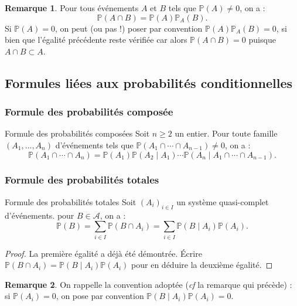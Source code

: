 \documentclass[french]{article}
\renewcommand{\P}{\mathbb{P}}
\theoremstyle{plain}
\theoremstyle{definition}
\newtheorem*{rmq}{Remarque}
\theoremstyle{remark}
\begin{document}
\begin{rmq}
	Pour tous événements $A$ et $B$ tels que $\P(A)\ne0$, on a : $$\P(A\cap B)=\P(A)\P_A(B).$$
	Si $\P(A)=0$, on peut (ou pas !) poser par convention $\P(A)\P_A(B)=0$, si bien que l'égalité précédente reste vérifiée car alors $\P(A\cap B)=0$ puisque $A\cap B\subset A$.
\end{rmq}

\subsection{Formules liées aux probabilités conditionnelles}

\subsubsection*{Formule des probabilités composée}

\begin{thm}{Formule des probabilités composées}%
	Soit $n\geqslant 2$ un entier. Pour toute famille $(A_1,\ldots,A_n)$ d'événements tels que $\P(A_1\cap\cdots\cap A_{n-1})\ne 0$, on a : 
	$$\P(A_1\cap\cdots\cap A_n)=\P(A_1)\P(A_2\mid A_1)\cdots\P(A_n\mid A_1\cap\cdots\cap A_{n-1}).$$
\end{thm}

\subsubsection*{Formule des probabilités totales}

\begin{thm}{Formule des probabilités totales}%
	Soit $(A_i)_{i\in I}$ un système quasi-complet d'événements. pour $B\in\mathcal{A}$, on a :
	$$\P(B)=\sum_{i\in I}\P(B\cap A_i)=\sum_{i\in I}\P(B\mid A_i)\P(A_i).$$
\end{thm}
\begin{proof}
	La première égalité a déjà été démontrée. Écrire $\P(B\cap A_i)=\P(B\mid A_i)\P(A_i)$ pour en déduire la deuxième égalité.
\end{proof}

\begin{rmq}
	On rappelle la convention adoptée (\textit{cf} la remarque qui précède) : si $\P(A_i)=0$, on pose par convention $\P(B\mid A_i)\P(A_i)=0$.
\end{rmq}
\end{document}
